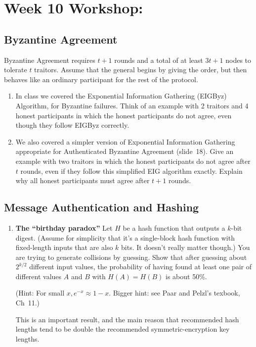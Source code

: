\documentclass[11pt]{article} %
\begin{document}
\section{Week 10 Workshop: }
\subsection{Byzantine Agreement}
Byzantine Agreement requires $t+1$ rounds and a total of at least $3t + 1$ nodes to tolerate $t$ traitors.  Assume that the general begins by giving the order, but then behaves like an ordinary participant for the rest of the protocol.
\begin{enumerate}
\item In class we covered the Exponential Information Gathering (EIGByz) Algorithm, for Byzantine failures.  Think of an example with 2 traitors and 4 honest participants in which the honest participants do not agree, even though they follow EIGByz correctly.
\item We also covered a simpler version of Exponential Information Gathering appropriate for Authenticated Byzantine Agreement (slide~18).  Give an example with two traitors in which the honest participants do not agree after $t$ rounds, even if they follow  this simplified EIG algorithm exactly.  Explain why all honest participants must agree after $t+1$ rounds.
\end{enumerate}

\subsection{Message Authentication and Hashing}
\begin{enumerate}
\item {\bf The ``birthday paradox''}  Let $H$ be a hash function that outputs a $k$-bit digest.  (Assume for simplicity that it's a single-block hash function with fixed-length inputs that are also $k$ bits.  It doesn't really matter though.)   You are trying to generate collisions by guessing.  Show that after guessing about $2^{k/2}$ different input values, the probability of having found at least one pair of different values $A$ and $B$ with $H(A) = H(B)$ is about 50\%. 

(Hint: For small $x, e^{-x} \approx 1-x$.  Bigger hint: see Paar and Pelzl's texbook, Ch~11.)

This is an important result, and the main reason that recommended hash lengths tend to be double the recommended symmetric-encryption key lengths.
\end{enumerate}
\end{document}
